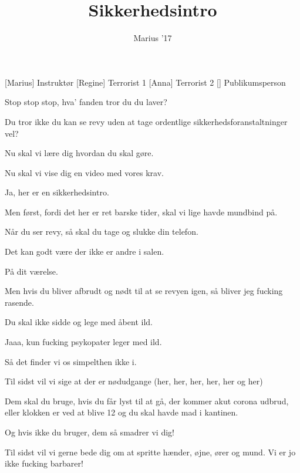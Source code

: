 \documentclass[a4paper,11pt]{article}
\title{Sikkerhedsintro}
\author{Marius '17}
\begin{document}
\maketitle

\begin{roles}
[Marius] Instruktør
[Regine] Terrorist 1
[Anna] Terrorist 2
[] Publikumsperson
\end{roles}

\begin{sketch}

 Stop stop stop, hva’ fanden tror du du laver?

 Du tror ikke du kan se revy uden at tage ordentlige sikkerhedsforanstaltninger vel?


 Nu skal vi lære dig hvordan du skal gøre.

 Nu skal vi vise dig en video med vores krav.

 Ja, her er en sikkerhedsintro.

 Men først, fordi det her er ret barske tider, skal vi lige havde mundbind på.


 Når du ser revy, så skal du tage og slukke din telefon.

 Det kan godt være der ikke er andre i salen.

 På dit værelse.

 Men hvis du bliver afbrudt og nødt til at se revyen igen, så bliver jeg fucking rasende.


 Du skal ikke sidde og lege med åbent ild.

 Jaaa, kun fucking psykopater leger med ild.

 Så det finder vi os simpelthen ikke i.

 Til sidst vil vi sige at der er nødudgange (her, her, her, her, her og her)


 Dem skal du bruge, hvis du får lyst til at gå, der kommer akut corona udbrud, eller klokken er ved at blive 12 og du skal havde mad i kantinen.

 Og hvis ikke du bruger, dem så smadrer vi dig!

 Til sidst vil vi gerne bede dig om at spritte hænder, øjne, ører og mund. Vi er jo ikke fucking barbarer!
\end{sketch}
\end{document}
